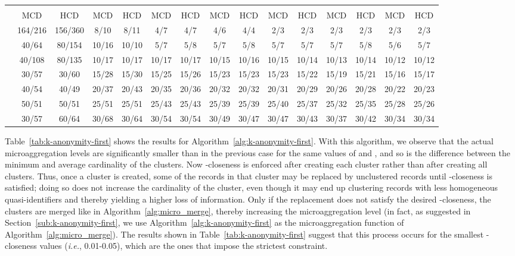 \documentclass[10pt,journal,compsoc]{IEEEtran}
\theoremstyle{definition}
\theoremstyle{plain}
\begin{document}
\begin{table*}
\caption{\label{tab:k-anonymity-first}Algorithm~\ref{alg:k-anonymity-first}: actual microaggregation (minimum and average
size of the clusters, respectively) resulting for several values of  and  for the MCD and HCD data sets.}
\centering
\scriptsize
\begin{tabular}{|l|cc|cc|cc|cc|cc|cc|cc|}\hline
 & \multicolumn{2}{c|}{} & \multicolumn{2}{c|}{} & \multicolumn{2}{c|}{} & \multicolumn{2}{c|}{} & \multicolumn{2}{c|}{} & \multicolumn{2}{c|}{} & \multicolumn{2}{c|}{}\\
& MCD & HCD & MCD & HCD & MCD & HCD & MCD & HCD & MCD & HCD & MCD & HCD & MCD & HCD\\
\hline
 & 164/216 & 156/360  & 8/10 & 8/11  & 4/7 & 4/7 & 4/6 & 4/4 & 2/3 & 2/3 & 2/3 & 2/3 & 2/3 & 2/3 \\
 & 40/64 & 80/154  & 10/16 & 10/10  & 5/7 & 5/8 & 5/7 & 5/8 & 5/7 & 5/7 & 5/7 & 5/8 & 5/6 & 5/7 \\
 & 40/108 & 80/135  & 10/17 & 10/17  & 10/17 & 10/17 & 10/15 & 10/16 & 10/15 & 10/14 & 10/13 & 10/14 & 10/12 & 10/12 \\
 & 30/57 & 30/60  & 15/28 & 15/30  & 15/25 & 15/26 & 15/23 & 15/23 & 15/23 & 15/22 & 15/19 & 15/21 & 15/16 & 15/17 \\
 & 40/54 & 40/49  & 20/37 & 20/43  & 20/35 & 20/36 & 20/32 & 20/32 & 20/31 & 20/29 & 20/26 & 20/28 & 20/22 & 20/23 \\
 & 50/51 & 50/51  & 25/51 & 25/51  & 25/43 & 25/43 & 25/39 & 25/39 & 25/40 & 25/37 & 25/32 & 25/35 & 25/28 & 25/26 \\
 & 30/57 & 60/64  & 30/68 & 30/64  & 30/54 & 30/54 & 30/49 & 30/47 & 30/47 & 30/43 & 30/37 & 30/42 & 30/34 & 30/34 \\
\hline
\end{tabular}
\end{table*} 

Table~\ref{tab:k-anonymity-first} shows the results for Algorithm~\ref{alg:k-anonymity-first}.
With this algorithm, we observe that the actual microaggregation levels are significantly smaller
than in the previous case for the same values of  and , and so is the difference
between the minimum and average cardinality of the clusters. 
Now -closeness is enforced after creating 
each cluster rather than after creating all clusters. Thus, once a cluster is created, 
some of the  records in that cluster may be replaced
by unclustered records until -closeness is satisfied; doing so 
does not increase the cardinality of the cluster, even though it 
may end up clustering records 
with less homogeneous quasi-identifiers and thereby yielding 
a higher loss of information. Only 
if the replacement does not satisfy the desired -closeness, the clusters 
are merged
like in Algorithm~\ref{alg:micro_merge}, 
thereby increasing the microaggregation level
(in fact, as suggested in Section~\ref{sub:k-anonymity-first}, we use 
Algorithm~\ref{alg:k-anonymity-first} as the microaggregation
function of Algorithm~\ref{alg:micro_merge}). 
The results shown in Table~\ref{tab:k-anonymity-first}
suggest that this process occurs for the smallest -closeness values
({\em i.e.}, 0.01-0.05), which are the ones that impose the strictest constraint. 
\end{document}
